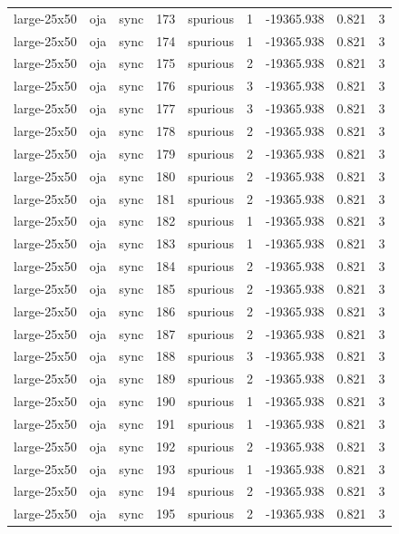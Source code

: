 \begin{tabular}{lllrlrrrr}
large-25x50 & oja & sync & 173 & spurious & 1 & -19365.938 & 0.821 & 3 \\
large-25x50 & oja & sync & 174 & spurious & 1 & -19365.938 & 0.821 & 3 \\
large-25x50 & oja & sync & 175 & spurious & 2 & -19365.938 & 0.821 & 3 \\
large-25x50 & oja & sync & 176 & spurious & 3 & -19365.938 & 0.821 & 3 \\
large-25x50 & oja & sync & 177 & spurious & 3 & -19365.938 & 0.821 & 3 \\
large-25x50 & oja & sync & 178 & spurious & 2 & -19365.938 & 0.821 & 3 \\
large-25x50 & oja & sync & 179 & spurious & 2 & -19365.938 & 0.821 & 3 \\
large-25x50 & oja & sync & 180 & spurious & 2 & -19365.938 & 0.821 & 3 \\
large-25x50 & oja & sync & 181 & spurious & 2 & -19365.938 & 0.821 & 3 \\
large-25x50 & oja & sync & 182 & spurious & 1 & -19365.938 & 0.821 & 3 \\
large-25x50 & oja & sync & 183 & spurious & 1 & -19365.938 & 0.821 & 3 \\
large-25x50 & oja & sync & 184 & spurious & 2 & -19365.938 & 0.821 & 3 \\
large-25x50 & oja & sync & 185 & spurious & 2 & -19365.938 & 0.821 & 3 \\
large-25x50 & oja & sync & 186 & spurious & 2 & -19365.938 & 0.821 & 3 \\
large-25x50 & oja & sync & 187 & spurious & 2 & -19365.938 & 0.821 & 3 \\
large-25x50 & oja & sync & 188 & spurious & 3 & -19365.938 & 0.821 & 3 \\
large-25x50 & oja & sync & 189 & spurious & 2 & -19365.938 & 0.821 & 3 \\
large-25x50 & oja & sync & 190 & spurious & 1 & -19365.938 & 0.821 & 3 \\
large-25x50 & oja & sync & 191 & spurious & 1 & -19365.938 & 0.821 & 3 \\
large-25x50 & oja & sync & 192 & spurious & 2 & -19365.938 & 0.821 & 3 \\
large-25x50 & oja & sync & 193 & spurious & 1 & -19365.938 & 0.821 & 3 \\
large-25x50 & oja & sync & 194 & spurious & 2 & -19365.938 & 0.821 & 3 \\
large-25x50 & oja & sync & 195 & spurious & 2 & -19365.938 & 0.821 & 3 \\

\end{tabular}
